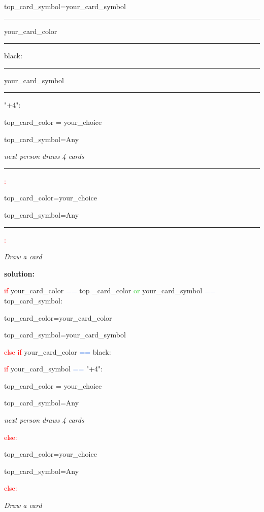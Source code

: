 \hspace{1cm}
top\_card\_symbol=your\_card\_symbol

\textcolor{red}{\rule[-0.5ex]{0.7cm}{1pt}} 
your\_card\_color \textcolor{CornflowerBlue}{\rule[-0.5ex]{0.7cm}{1pt}} black:

\hspace{1cm}
\textcolor{red}{\rule[-0.5ex]{0.7cm}{1pt}} your\_card\_symbol \textcolor{CornflowerBlue}{\rule[-0.5ex]{0.7cm}{1pt}} "+4":

\hspace{2cm} top\_card\_color = your\_choice

\hspace{2cm}
top\_card\_symbol=Any

\hspace{2cm}
\textit{next person draws 4 cards}

\hspace{1cm}
\textcolor{red}{\rule[-0.5ex]{0.7cm}{1pt}:}

\hspace{2cm}
top\_card\_color=your\_choice

\hspace{2cm}
top\_card\_symbol=Any

\textcolor{red}{\rule[-0.5ex]{0.7cm}{1pt}:}

\hspace{1cm}
\textit{Draw a card}

\vspace{1cm}

\textbf{solution:}



\textcolor{red}{if} your\_card\_color \textcolor{CornflowerBlue}{==} top \_card\_color \textcolor{LimeGreen}{or}
your\_card\_symbol \textcolor{CornflowerBlue}{==}
top\_card\_symbol:

\hspace{1cm}
top\_card\_color=your\_card\_color

\hspace{1cm}
top\_card\_symbol=your\_card\_symbol

\textcolor{red}{else if} 
your\_card\_color \textcolor{CornflowerBlue}{==} black:

\hspace{1cm}
\textcolor{red}{if} your\_card\_symbol \textcolor{CornflowerBlue}{==} "+4":

\hspace{2cm} top\_card\_color = your\_choice

\hspace{2cm}
top\_card\_symbol=Any

\hspace{2cm}
\textit{next person draws 4 cards}

\hspace{1cm}
\textcolor{red}{else:}

\hspace{2cm}
top\_card\_color=your\_choice

\hspace{2cm}
top\_card\_symbol=Any

\textcolor{red}{else:}

\hspace{1cm}
\textit{Draw a card}












